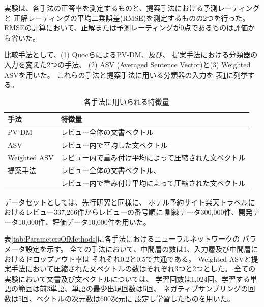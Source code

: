\documentclass{ttithesis}
\begin{document}
実験は、各手法の正答率を測定するものと、提案手法における予測レーティングと
正解レーティングの平均二乗誤差(RMSE)を測定するものの2つを行った。
RMSEの計算において、正解または予測レーティングが0点であるものは評価から省いた。

比較手法として、(1) Quocら\cite{quoc14}によるPV-DM、及び、
提案手法における分類器の入力を変えた2つの手法、
(2) ASV (Averaged Sentence Vector)と(3) Weighted ASVを用いた。
これらの手法と提案手法に用いる分類器の入力を
表\ref{tab:MethodFeatures}に列挙する。

\begin{table}[b!]
  \caption{各手法に用いられる特徴量}
  \centering
  \begin{tabularx}{\linewidth}{l | X} \label{tab:MethodFeatures}
    手法 & 特徴量 \\
    \hline
    PV-DM & レビュー全体の文書ベクトル \\
    \hline
    ASV & レビュー内で平均した文ベクトル \\
    \hline
    Weighted ASV & レビュー内で重み付け平均によって圧縮された文ベクトル \\
    \hline
    提案手法 & レビュー全体の文書ベクトル、\\
             & レビュー内で重み付け平均によって圧縮された文ベクトル \\
  \end{tabularx}
\end{table}


データセットとしては、先行研究\cite{fujitani15}と同様に、
ホテル予約サイト楽天トラベルにおけるレビュー337,266件からレビューの番号順に
訓練データ300,000件、開発データ10,000件、評価データ10,000件を用いた。


表\ref{tab:ParametersOfMethods}に各手法におけるニューラルネットワークの
パラメータ設定を示す。
全ての手法において、中間層の数は1、入力層及び中間層におけるドロップアウト率は
それぞれ0.2と0.5で共通である。
Weighted ASVと提案手法において圧縮された文ベクトルの数はそれぞれ3つと2つとした。
全ての実験において文書及び文ベクトルについては、
学習回数は1,024回、学習する単語の範囲は前3単語、単語の最少出現回数は5回、
ネガティブサンプリングの回数は5回、ベクトルの次元数は600次元に
設定し学習したものを用いた。
\end{document}
